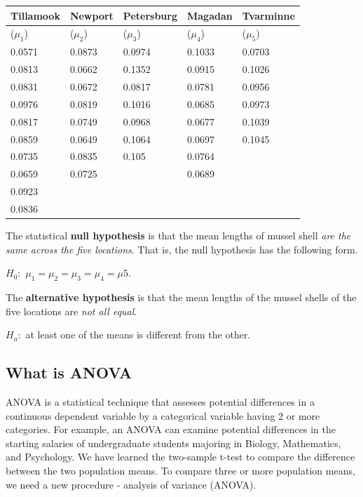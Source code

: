 \documentclass[
]{book}
\begin{document}
\begin{longtable}[]{@{}lllll@{}}
\toprule\noalign{}
Tillamook & Newport & Petersburg & Magadan & Tvarminne \\
\midrule\noalign{}
\endhead
\bottomrule\noalign{}
\endlastfoot
(\(\mu_1\)) & (\(\mu_2\)) & (\(\mu_3\)) & (\(\mu_4\)) & (\(\mu_5\)) \\
0.0571 & 0.0873 & 0.0974 & 0.1033 & 0.0703 \\
0.0813 & 0.0662 & 0.1352 & 0.0915 & 0.1026 \\
0.0831 & 0.0672 & 0.0817 & 0.0781 & 0.0956 \\
0.0976 & 0.0819 & 0.1016 & 0.0685 & 0.0973 \\
0.0817 & 0.0749 & 0.0968 & 0.0677 & 0.1039 \\
0.0859 & 0.0649 & 0.1064 & 0.0697 & 0.1045 \\
0.0735 & 0.0835 & 0.105 & 0.0764 & \\
0.0659 & 0.0725 & & 0.0689 & \\
0.0923 & & & & \\
0.0836 & & & & \\
\end{longtable}

The statistical \textbf{null hypothesis} is that the mean lengths of mussel shell \emph{are the same across the five locations}. That is, the null hypothesis has the following form.

\(H_0:\) \(\mu_1 = \mu_2 = \mu_3 = \mu_4 = \mu5.\)

The \textbf{alternative hypothesis} is that the mean lengths of the mussel shells of the five locations are \emph{not all equal}.

\(H_a:\) at least one of the means is different from the other.

\hypertarget{what-is-anova}{%
\subsection{What is ANOVA}\label{what-is-anova}}

ANOVA is a statistical technique that assesses potential differences in a continuous dependent variable by a categorical variable having 2 or more categories. For example, an ANOVA can examine potential differences in the starting salaries of undergraduate students majoring in Biology, Mathematics, and Psychology. We have learned the two-sample t-test to compare the difference between the two population means. To compare three or more population means, we need a new procedure - analysis of variance (ANOVA).
\end{document}
